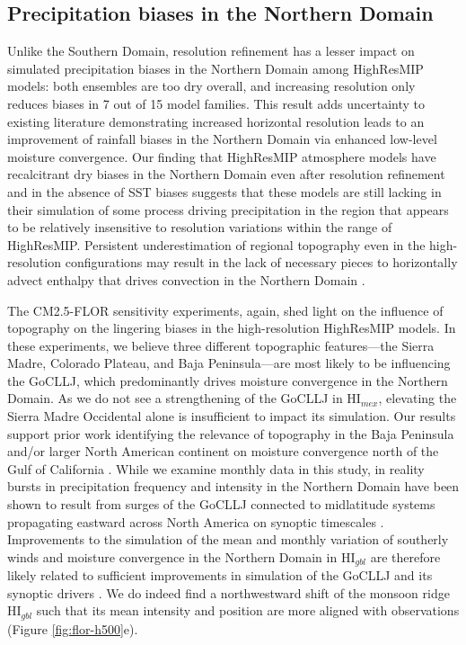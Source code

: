 \documentclass[draft]{agujournal2019}
\begin{document}
\subsection{Precipitation biases in the Northern Domain}
Unlike the Southern Domain, resolution refinement has a lesser impact on simulated precipitation biases in the Northern Domain among HighResMIP models: both ensembles are too dry overall, and increasing resolution only reduces biases in 7 out of 15 model families. This result adds uncertainty to existing literature demonstrating increased horizontal resolution leads to an improvement of rainfall biases in the Northern Domain via enhanced low-level moisture convergence. Our finding that HighResMIP atmosphere models have recalcitrant dry biases in the Northern Domain even after resolution refinement and in the absence of SST biases suggests that these models are still lacking in their simulation of some process driving precipitation in the region that appears to be relatively insensitive to resolution variations within the range of HighResMIP. Persistent underestimation of regional topography even in the high-resolution configurations may result in the lack of necessary pieces to horizontally advect enthalpy that drives convection in the Northern Domain \cite{pascale18jc,varuolo-clarke19jc,johnson23jc}.

The CM2.5-FLOR sensitivity experiments, again, shed light on the influence of topography on the lingering biases in the high-resolution HighResMIP models. In these experiments, we believe three different topographic features---the Sierra Madre, Colorado Plateau, and Baja Peninsula---are most likely to be influencing the GoCLLJ, which predominantly drives moisture convergence in the Northern Domain. As we do not see a strengthening of the GoCLLJ in HI$_{mex}$, elevating the Sierra Madre Occidental alone is insufficient to impact its simulation. Our results support prior work identifying the relevance of topography in the Baja Peninsula and/or larger North American continent on moisture convergence north of the Gulf of California \cite{tang84mwr,anderson00bjgra,newman12mwr,pascale16jc,varuolo-clarke19jc,johnson23jc,johnson25pdt}. While we examine monthly data in this study, in reality bursts in precipitation frequency and intensity in the Northern Domain have been shown to result from surges of the GoCLLJ connected to midlatitude systems propagating eastward across North America on synoptic timescales \cite{stensrud97mwr,pascale16mwr,pascale16jc}. Improvements to the simulation of the mean and monthly variation of southerly winds and moisture convergence in the Northern Domain in HI$_{gbl}$ are therefore likely related to sufficient improvements in simulation of the GoCLLJ and its synoptic drivers \cite{mullen98mwr,turrent09grl,castro12jc,pascale16jc,pascale18jc}. We do indeed find a northwestward shift of the monsoon ridge HI$_{gbl}$ such that its mean intensity and position are more aligned with observations (Figure \ref{fig:flor-h500}e). 
\end{document}
